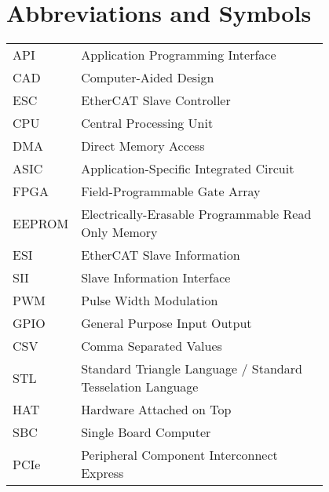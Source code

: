 \chapter*{Abbreviations and Symbols}

\begin{flushleft}
\begin{tabular}{l p{0.8\linewidth}}
API	& Application Programming Interface\\
CAD	& Computer-Aided Design\\
ESC	& EtherCAT Slave Controller\\
CPU	& Central Processing Unit\\
DMA	& Direct Memory Access\\
ASIC	& Application-Specific Integrated Circuit\\
FPGA	& Field-Programmable Gate Array\\
EEPROM	& Electrically-Erasable Programmable Read Only Memory\\
ESI	& EtherCAT Slave Information\\
SII	& Slave Information Interface\\
PWM	& Pulse Width Modulation\\
GPIO	& General Purpose Input Output\\
CSV	& Comma Separated Values\\
STL	& Standard Triangle Language / Standard Tesselation Language\\
HAT	& Hardware Attached on Top\\
SBC	& Single Board Computer\\
PCIe	& Peripheral Component Interconnect Express\\
\end{tabular}
\end{flushleft}

